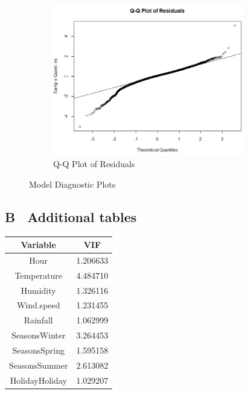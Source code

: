 \documentclass[12 pt]{scrartcl}
\begin{document}
\begin{figure}[ht]
\begin{subfigure}{.5\textwidth}
  \centering
  \includegraphics[height=2.6in,width=1\linewidth]{Q-Q Plot of Residuals.png}  
  \caption{Q-Q Plot of Residuals}
  \label{fig:sub-first}
\end{subfigure}
\caption{Model Diagnostic Plots}
\label{fig:fig}
\end{figure}

\newpage

\subsection*{B \ Additional tables}

\begin{table}[ht]
\centering
{}
\label{description}
\begin{tabular}{c|c}
\textbf{Variable}  & \textbf{VIF} \\
\hline
Hour &  1.206633\\
Temperature  & 4.484710\\
Humidity &  1.326116\\
Wind.speed & 1.231455\\
Rainfall  & 1.062999\\
SeasonsWinter & 3.264453\\
SeasonsSpring & 1.595158\\
SeasonsSummer & 2.613082\\
HolidayHoliday & 1.029207\\
\end{tabular}
\end{table}
\end{document}

